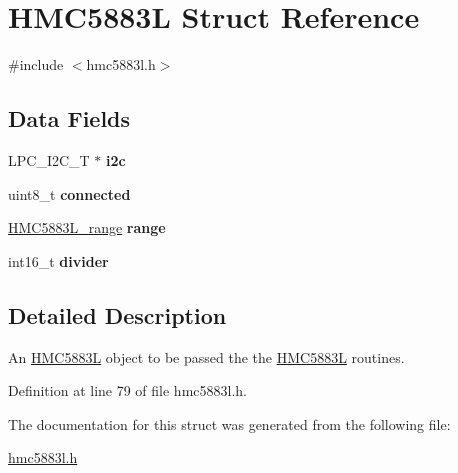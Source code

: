 \hypertarget{structHMC5883L}{}\section{H\+M\+C5883L Struct Reference}
\label{structHMC5883L}


{\ttfamily \#include $<$hmc5883l.\+h$>$}

\subsection*{Data Fields}
\begin{DoxyCompactItemize}
\item 
L\+P\+C\+\_\+\+I2\+C\+\_\+T $\ast$ {\bfseries i2c}\hypertarget{structHMC5883L_ab2edde7020ce0365265e7ba6f71a3e8b}{}\label{structHMC5883L_ab2edde7020ce0365265e7ba6f71a3e8b}

\item 
uint8\+\_\+t {\bfseries connected}\hypertarget{structHMC5883L_ad80cc8a1634a07add5886a5e0df835ce}{}\label{structHMC5883L_ad80cc8a1634a07add5886a5e0df835ce}

\item 
\hyperlink{hmc5883l_8h_a741d6341bd7d31bf60ea406397fd4ffe}{H\+M\+C5883\+L\+\_\+range} {\bfseries range}\hypertarget{structHMC5883L_ab914a355b6eb48243fce1936702f3d7c}{}\label{structHMC5883L_ab914a355b6eb48243fce1936702f3d7c}

\item 
int16\+\_\+t {\bfseries divider}\hypertarget{structHMC5883L_a946047cdc4bf51d366c1aa0204c799af}{}\label{structHMC5883L_a946047cdc4bf51d366c1aa0204c799af}

\end{DoxyCompactItemize}


\subsection{Detailed Description}
An \hyperlink{structHMC5883L}{H\+M\+C5883L} object to be passed the the \hyperlink{structHMC5883L}{H\+M\+C5883L} routines. 

Definition at line 79 of file hmc5883l.\+h.



The documentation for this struct was generated from the following file\+:\begin{DoxyCompactItemize}
\item 
\hyperlink{hmc5883l_8h}{hmc5883l.\+h}\end{DoxyCompactItemize}
